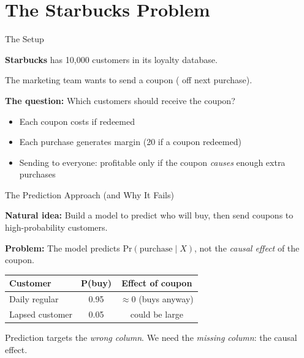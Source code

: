 \documentclass[aspectratio=169, 11pt, handout]{beamer}
\newcommand{\Prob}{\mathrm{Pr}}
\begin{document}
\section{The Starbucks Problem}

\begin{frame}{The Setup}

\textbf{Starbucks} has 10,000 customers in its loyalty database.

\bigskip

The marketing team wants to send a coupon ( off next purchase).

\bigskip

\textbf{The question:} Which customers should receive the coupon?

\bigskip

\begin{itemize}
    \item Each coupon costs  if redeemed
    \item Each purchase generates  margin (20 if a coupon redeemed)
    \item Sending to everyone: profitable only if the coupon \emph{causes} enough extra purchases
\end{itemize}
\end{frame}

\begin{frame}{The Prediction Approach (and Why It Fails)}

\textbf{Natural idea:} Build a model to predict who will buy, then send coupons to high-probability customers.

\bigskip
\pause

\textbf{Problem:} The model predicts $\Prob(\text{purchase} \mid X)$, not the \emph{causal effect} of the coupon.

\bigskip

\begin{center}
\begin{tabular}{lcc}
\toprule
\textbf{Customer} & \textbf{P(buy)} & \textbf{Effect of coupon} \\
\midrule
Daily regular & 0.95 & $\approx 0$ (buys anyway) \\
Lapsed customer & 0.05 & could be large \\
\bottomrule
\end{tabular}
\end{center}

\bigskip

Prediction targets the \emph{wrong column}. We need the \emph{missing column}: the causal effect.
\end{frame}
\end{document}
